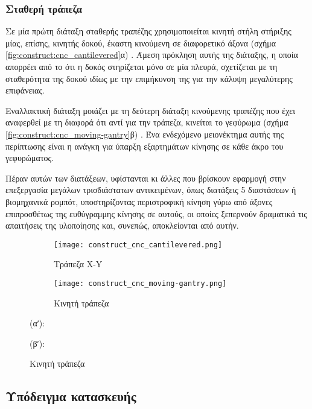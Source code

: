 \subsubsection{Σταθερή τράπεζα}

Σε μία πρώτη διάταξη σταθερής τραπέζης χρησιμοποιείται κινητή στήλη στήριξης
μίας, επίσης, κινητής δοκού, έκαστη κινούμενη σε διαφορετικό άξονα (σχήμα
\ref{fig:construct:cnc_cantilevered}α) \parencite[70]{albert11}. Άμεση πρόκληση
αυτής της διάταξης, η οποία απορρέει από το ότι η δοκός στηρίζεται μόνο σε μία
πλευρά, σχετίζεται με τη σταθερότητα της δοκού ιδίως με την επιμήκυνση της για
την κάλυψη μεγαλύτερης επιφάνειας.

Εναλλακτική διάταξη μοιάζει με τη δεύτερη διάταξη κινούμενης τραπέζης που έχει
αναφερθεί με τη διαφορά ότι αντί για την τράπεζα, κινείται το γεφύρωμα (σχήμα
\ref{fig:construct:cnc_moving-gantry}β) \parencite[71]{albert11}.
Ένα ενδεχόμενο μειονέκτημα αυτής της περίπτωσης είναι η ανάγκη για ύπαρξη
εξαρτημάτων κίνησης σε κάθε άκρο του γεφυρώματος.

Πέραν αυτών των διατάξεων, υφίστανται κι άλλες που βρίσκουν εφαρμογή στην
επεξεργασία μεγάλων τρισδιάστατων αντικειμένων, όπως διατάξεις 5 διαστάσεων ή
βιομηχανικά ρομπότ, υποστηρίζοντας περιστροφική κίνηση γύρω από άξονες
επιπροσθέτως της ευθύγραμμης κίνησης σε αυτούς, οι οποίες ξεπερνούν δραματικά
τις απαιτήσεις της υλοποίησης και, συνεπώς, αποκλείονται από αυτήν.

\begin{figure}
    \caption{Διατάξεις σταθερής τραπέζης.
        \label{fig:construct:cnc_fixed-table}}
    \begin{center}
        \begin{subfigure}[b]{0.40\textwidth}
            \texttt{[image: construct\_cnc\_cantilevered.png]}
            \caption{Τράπεζα X-Y}
        \end{subfigure}
        \begin{subfigure}[b]{0.40\textwidth}
            \texttt{[image: construct\_cnc\_moving-gantry.png]}
            \caption{Κινητή τράπεζα}
        \end{subfigure}
    \end{center}

    (αʹ): 

    (βʹ): 
\end{figure}

\subsection{Υπόδειγμα κατασκευής}

